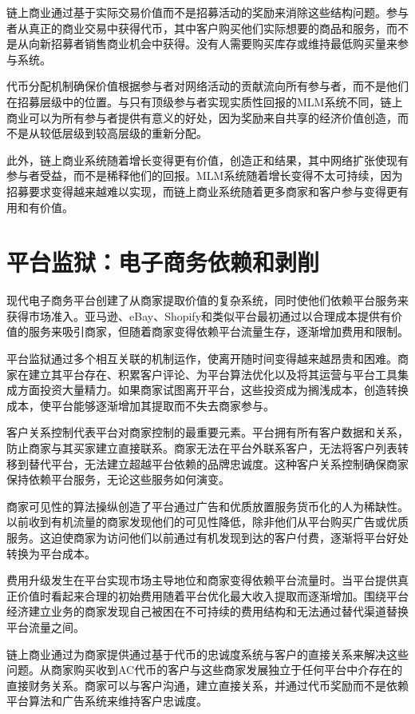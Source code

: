 \documentclass[
  Letterpaper,
]{scrbook}
\begin{document}
链上商业通过基于实际交易价值而不是招募活动的奖励来消除这些结构问题。参与者从真正的商业交易中获得代币，其中客户购买他们实际想要的商品和服务，而不是从向新招募者销售商业机会中获得。没有人需要购买库存或维持最低购买量来参与系统。

代币分配机制确保价值根据参与者对网络活动的贡献流向所有参与者，而不是他们在招募层级中的位置。与只有顶级参与者实现实质性回报的MLM系统不同，链上商业可以为所有参与者提供有意义的好处，因为奖励来自共享的经济价值创造，而不是从较低层级到较高层级的重新分配。

此外，链上商业系统随着增长变得更有价值，创造正和结果，其中网络扩张使现有参与者受益，而不是稀释他们的回报。MLM系统随着增长变得不太可持续，因为招募要求变得越来越难以实现，而链上商业系统随着更多商家和客户参与变得更有用和有价值。

\section{平台监狱：电子商务依赖和剥削}\label{ux5e73ux53f0ux76d1ux72f1ux7535ux5b50ux5546ux52a1ux4f9dux8d56ux548cux5265ux524a}

现代电子商务平台创建了从商家提取价值的复杂系统，同时使他们依赖平台服务来获得市场准入。亚马逊、eBay、Shopify和类似平台最初通过以合理成本提供有价值的服务来吸引商家，但随着商家变得依赖平台流量生存，逐渐增加费用和限制。

平台监狱通过多个相互关联的机制运作，使离开随时间变得越来越昂贵和困难。商家在建立其平台存在、积累客户评论、为平台算法优化以及将其运营与平台工具集成方面投资大量精力。如果商家试图离开平台，这些投资成为搁浅成本，创造转换成本，使平台能够逐渐增加其提取而不失去商家参与。

客户关系控制代表平台对商家控制的最重要元素。平台拥有所有客户数据和关系，防止商家与其买家建立直接联系。商家无法在平台外联系客户，无法将客户列表转移到替代平台，无法建立超越平台依赖的品牌忠诚度。这种客户关系控制确保商家保持依赖平台服务，无论这些服务如何演变。

商家可见性的算法操纵创造了平台通过广告和优质放置服务货币化的人为稀缺性。以前收到有机流量的商家发现他们的可见性降低，除非他们从平台购买广告或优质服务。这迫使商家为访问他们以前通过有机发现到达的客户付费，逐渐将平台好处转换为平台成本。

费用升级发生在平台实现市场主导地位和商家变得依赖平台流量时。当平台提供真正价值时看起来合理的初始费用随着平台优化最大收入提取而逐渐增加。围绕平台经济建立业务的商家发现自己被困在不可持续的费用结构和无法通过替代渠道替换平台流量之间。

链上商业通过为商家提供通过基于代币的忠诚度系统与客户的直接关系来解决这些问题。从商家购买收到AC代币的客户与这些商家发展独立于任何平台中介存在的直接财务关系。商家可以与客户沟通，建立直接关系，并通过代币奖励而不是依赖平台算法和广告系统来维持客户忠诚度。
\end{document}
